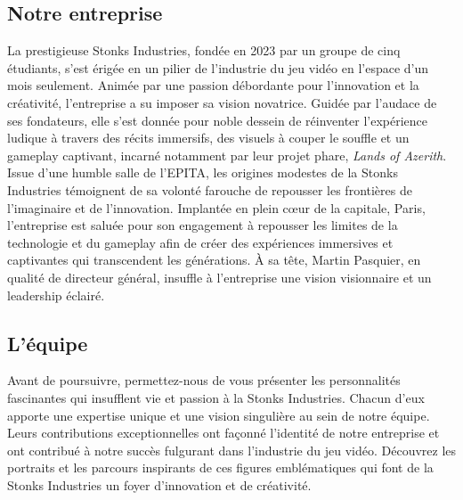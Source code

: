 \subsection{Notre entreprise}

La prestigieuse Stonks Industries, fondée en 2023 par un groupe de cinq étudiants, s'est érigée en un pilier de l'industrie du jeu vidéo en l'espace d'un mois seulement.
Animée par une passion débordante pour l'innovation et la créativité, l'entreprise a su imposer sa vision novatrice.
Guidée par l'audace de ses fondateurs, elle s'est donnée pour noble dessein de réinventer l'expérience ludique à travers des récits immersifs, des visuels à couper le souffle et un gameplay captivant, incarné notamment par leur projet phare, \textit{Lands of Azerith}.
\\

Issue d'une humble salle de l'EPITA, les origines modestes de la Stonks Industries témoignent de sa volonté farouche de repousser les frontières de l'imaginaire et de l'innovation.
Implantée en plein cœur de la capitale, Paris, l'entreprise est saluée pour son engagement à repousser les limites de la technologie et du gameplay afin de créer des expériences immersives et captivantes qui transcendent les générations.
À sa tête, Martin Pasquier, en qualité de directeur général, insuffle à l'entreprise une vision visionnaire et un leadership éclairé.

\subsection{L'équipe}

Avant de poursuivre, permettez-nous de vous présenter les personnalités fascinantes qui insufflent vie et passion à la Stonks Industries.
Chacun d'eux apporte une expertise unique et une vision singulière au sein de notre équipe.
Leurs contributions exceptionnelles ont façonné l'identité de notre entreprise et ont contribué à notre succès fulgurant dans l'industrie du jeu vidéo.
Découvrez les portraits et les parcours inspirants de ces figures emblématiques qui font de la Stonks Industries un foyer d'innovation et de créativité.

